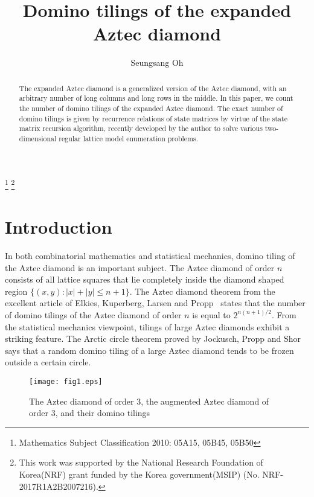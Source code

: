 \documentclass[11pt,a4paper]{amsart}
\begin{document}
\title{Domino tilings of the expanded Aztec diamond}

\author[S. Oh]{Seungsang Oh}
\address{Department of Mathematics, Korea University, Seoul 02841, Korea}

\thanks{Mathematics Subject Classification 2010: 05A15, 05B45, 05B50}
\thanks{This work was supported by the National Research Foundation of Korea(NRF) grant funded by the Korea government(MSIP) (No. NRF-2017R1A2B2007216).}


\maketitle


\begin{abstract}
The expanded Aztec diamond is a generalized version of the Aztec diamond,
with an arbitrary number of long columns and long rows in the middle. 
In this paper, we count the number of domino tilings of the expanded Aztec diamond. 
The exact number of domino tilings is given by recurrence relations of state matrices 
by virtue of the state matrix recursion algorithm, 
recently developed by the author to solve various two-dimensional regular lattice model enumeration problems.
\end{abstract}


\section{Introduction} \label{sec:intro}

In both combinatorial mathematics and statistical mechanics,
domino tiling of the Aztec diamond is an important subject.
The Aztec diamond of order $n$ consists of all lattice squares 
that lie completely inside the diamond shaped region $\{ (x,y) : |x|+|y| \leq n+1 \}$. 
The Aztec diamond theorem from the excellent article of Elkies, Kuperberg, Larsen and Propp~\cite{EKLP}
states that the number of domino tilings of the Aztec diamond of order $n$ is equal to $2^{n(n+1)/2}$.
From the statistical mechanics viewpoint, tilings of large Aztec diamonds exhibit a striking feature. 
The Arctic circle theorem proved by Jockusch, Propp and Shor~\cite{JPS}
says that a random domino tiling of a large Aztec diamond tends to be frozen outside a certain circle.

\begin{figure}[h]
\texttt{[image: fig1.eps]}
\caption{The Aztec diamond of order 3, the augmented Aztec diamond of order 3,
and their domino tilings}
\label{fig:Aztec}
\end{figure}
\end{document}
